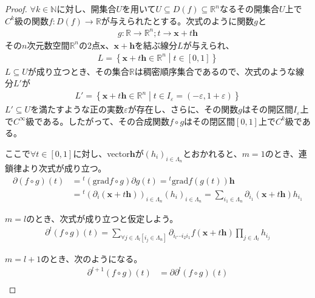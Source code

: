 \documentclass[dvipdfmx]{jsarticle}
\begin{document}
\begin{proof}
$\forall k \in \mathbb{N}$に対し、開集合$U$を用いて$U \subseteq D(f) \subseteq \mathbb{R}^{n}$なるその開集合$U$上で$C^{k}$級の関数$f:D(f) \rightarrow \mathbb{R}$が与えられたとする。次式のように関数$g$と
\begin{align*}
g:\mathbb{R} \rightarrow \mathbb{R}^{n};t \rightarrow \mathbf{x} + t\mathbf{h}
\end{align*}
その$n$次元数空間$\mathbb{R}^{n}$の2点$\mathbf{x}$、$\mathbf{x} + \mathbf{h}$を結ぶ線分$L$が与えられ、
\begin{align*}
L = \left\{ \mathbf{x} + t\mathbf{h} \in \mathbb{R}^{n} \middle| t \in [ 0,1] \right\}
\end{align*}
$L \subseteq U$が成り立つとき、その集合$\mathbb{R}$は稠密順序集合であるので、次式のような線分$L'$が
\begin{align*}
L' = \left\{ \mathbf{x} + t\mathbf{h} \in \mathbb{R}^{n} \middle| t \in I_{\varepsilon} = ( - \varepsilon,1 + \varepsilon) \right\}
\end{align*}
$L' \subseteq U$を満たすような正の実数$\varepsilon$が存在し、さらに、その関数$g$はその開区間$I_{\varepsilon}$上で$C^{\infty}$級である。したがって、その合成関数$f \circ g$はその閉区間$[ 0,1]$上で$C^{k}$級である。\par
ここで$\forall t \in [ 0,1]$に対し、vector$\mathbf{h}$が$\left( h_{i} \right)_{i \in \varLambda_{n}}$とおかれると、$m = 1$のとき、連鎖律より次式が成り立つ。
\begin{align*}
\partial(f \circ g)(t) &={}^{t}\left( \mathrm{grad}f \circ g \right)\partial g(t) ={}^{t}\mathrm{grad}f\left( g(t) \right)\mathbf{h}\\
&={}^{t}\left( \partial_{i}\left( \mathbf{x} + t\mathbf{h} \right) \right)_{i \in \varLambda_{n}}\left( h_{i} \right)_{i \in \varLambda_{n}} = \sum_{i_{1} \in \varLambda_{n}} {\partial_{i_{1}}\left( \mathbf{x} + t\mathbf{h} \right)h_{i_{1}}}
\end{align*}\par
$m = l$のとき、次式が成り立つと仮定しよう。
\begin{align*}
\partial^{l}(f \circ g)(t) = \sum_{\forall j \in \varLambda_{l}\left[ i_{j} \in \varLambda_{n} \right]} {\partial_{i_{l}\cdots i_{2}i_{1}}f\left( \mathbf{x} + t\mathbf{h} \right)\prod_{j \in \varLambda_{l}} h_{i_{j}}}
\end{align*}\par
$m = l + 1$のとき、次のようになる。
\begin{align*}
\partial^{l + 1}(f \circ g)(t) &= \partial\partial^{l}(f \circ g)(t)\\

\end{align*}
\end{proof}
\end{document}
